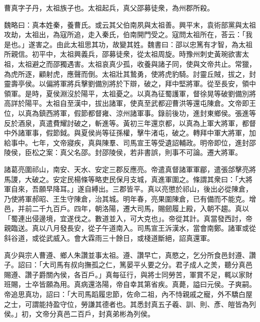 
\begin{pinyinscope}
曹真字子丹，太祖族子也。太祖起兵，真父邵募徒衆，為州郡所殺。

魏略曰：真本姓秦，養曹氏。或云其父伯南夙與太祖善。興平末，袁術部黨與太祖攻劫，太祖出，為寇所追，走入秦氏，伯南開門受之。寇問太祖所在，荅云：「我是也。」遂害之。由此太祖思其功，故變其姓。魏書曰：邵以忠篤有才智，為太祖所親信。初平中，太祖興義兵，邵募徒衆，從太祖周旋。時豫州刺史黃琬欲害太祖，太祖避之而邵獨遇害。太祖哀真少孤，收養與諸子同，使與文帝共止。常獵，為虎所逐，顧射虎，應聲而倒。太祖壯其鷙勇，使將虎豹騎。討靈丘賊，拔之，封靈壽亭侯。以偏將軍將兵擊劉備別將於下辯，破之，拜中堅將軍。從至長安，領中領軍。是時，夏侯淵沒於陽平，太祖憂之。以真為征蜀護軍，督徐晃等破劉備別將高詳於陽平。太祖自至漢中，拔出諸軍，使真至武都迎曹洪等還屯陳倉。文帝即王位，以真為鎮西將軍，假節都督雍、涼州諸軍事。錄前後功，進封東鄉侯。張進等反於酒泉，真遣費耀討破之，斬進等。黃初三年還京都，以真為上軍大將軍，都督中外諸軍事，假節鉞。與夏侯尚等征孫權，擊牛渚屯，破之。轉拜中軍大將軍，加給事中。七年，文帝寢疾，真與陳羣、司馬宣王等受遺詔輔政。明帝即位，進封邵陵侯，臣松之案：真父名邵。封邵陵侯，若非書誤，則事不可論。遷大將軍。

諸葛亮圍祁山，南安、天水、安定三郡反應亮。帝遣真督諸軍軍郿，遣張郃擊亮將馬謖，大破之。安定民楊條等略吏民保月支城，真進軍圍之。條謂其衆曰：「大將軍自來，吾願早降耳。」遂自縛出。三郡皆平。真以亮懲於祁山，後出必從陳倉，乃使將軍郝昭、王生守陳倉，治其城。明年春，亮果圍陳倉，已有備而不能克。增邑，并前二千九百戶。四年，朝洛陽，遷大司馬，賜劒履上殿，入朝不趨。真以「蜀連出侵邊境，宜遂伐之。數道並入，可大克也」。帝從其計。真當發西討，帝親臨送。真以八月發長安，從子午道南入。司馬宣王泝漢水，當會南鄭。諸軍或從斜谷道，或從武威入。會大霖雨三十餘日，或棧道斷絕，詔真還軍。

真少與宗人曹遵、鄉人朱讚並事太祖。遵、讚早亡，真愍之，乞分所食邑封遵、讚子。詔曰：「大司馬有叔向撫孤之仁，篤晏平乆要之分。君子成人之羙，聽分真邑賜遵、讚子爵關內侯，各百戶。」真每征行，與將士同勞苦，軍賞不足，輒以家財班賜，士卒皆願為用。真病還洛陽，帝自幸其第省疾。真薨，謚曰元侯。子爽嗣。帝追思真功，詔曰：「大司馬蹈履忠節，佐命二祖，內不恃親戚之寵，外不驕白屋之士，可謂能持盈守位，勞謙其德者也。其悉封真五子羲、訓、則、彥、皚皆為列侯。」初，文帝分真邑二百戶，封真弟彬為列侯。


\end{pinyinscope}